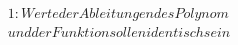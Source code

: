 \documentclass[preview]{standalone}
\begin{document}
\begin{align*}
1: Werte der Ableitungen des Polynom \\und der Funktion sollen identisch sein
\end{align*}
\end{document}
